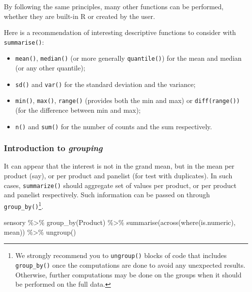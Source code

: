 \documentclass[
]{krantz}
\makeatletter
\newenvironment{Shaded}{\begin{snugshade}}{\end{snugshade}}
\newcommand{\FunctionTok}[1]{\textcolor[rgb]{0,0,0}{#1}}
\newcommand{\NormalTok}[1]{#1}
\newcommand{\SpecialCharTok}[1]{\textcolor[rgb]{0,0,0}{#1}}
\providecommand{\tightlist}{%
  \setlength{\itemsep}{0pt}\setlength{\parskip}{0pt}}
\newenvironment{kframe}{%
\medskip{}
\setlength{\fboxsep}{.8em}
 \def\at@end@of@kframe{}%
 \ifinner\ifhmode%
  \def\at@end@of@kframe{\end{minipage}}%
  \begin{minipage}{\columnwidth}%
 \fi\fi%
 \def\FrameCommand##1{\hskip\@totalleftmargin \hskip-\fboxsep
 \colorbox{shadecolor}{##1}\hskip-\fboxsep
     \hskip-\linewidth \hskip-\@totalleftmargin \hskip\columnwidth}%
 \MakeFramed {\advance\hsize-\width
   \@totalleftmargin\z@ \linewidth\hsize
   \@setminipage}}%
 {\par\unskip\endMakeFramed%
 \at@end@of@kframe}
\renewenvironment{Shaded}{\begin{kframe}}{\end{kframe}}
\makeatother
\begin{document}
By following the same principles, many other functions can be performed, whether they are built-in R or created by the user.

Here is a recommendation of interesting descriptive functions to consider with \texttt{summarise()}:

\begin{itemize}
\tightlist
\item
  \texttt{mean()}, \texttt{median()} (or more generally \texttt{quantile()}) for the mean and median (or any other quantile);
\item
  \texttt{sd()} and \texttt{var()} for the standard deviation and the variance;
\item
  \texttt{min()}, \texttt{max()}, \texttt{range()} (provides both the min and max) or \texttt{diff(range())} (for the difference between min and max);
\item
  \texttt{n()} and \texttt{sum()} for the number of counts and the sum respectively.
\end{itemize}

\hypertarget{introduction-to-grouping}{%
\subsubsection{\texorpdfstring{Introduction to \emph{grouping}}{Introduction to grouping}}\label{introduction-to-grouping}}

It can appear that the interest is not in the grand mean, but in the mean per product (say), or per product and panelist (for test with duplicates). In such cases, \texttt{summarize()} should aggregate set of values per product, or per product and panelist respectively. Such information can be passed on through \texttt{group\_by()}\footnote{We strongly recommend you to \texttt{ungroup()} blocks of code that includes \texttt{group\_by()} once the computations are done to avoid any unexpected results. Otherwise, further computations may be done on the groups when it should be performed on the full data.}.

\begin{Shaded}
\begin{Highlighting}[]
\NormalTok{sensory }\SpecialCharTok{\%\textgreater{}\%}
  \FunctionTok{group\_by}\NormalTok{(Product) }\SpecialCharTok{\%\textgreater{}\%}
  \FunctionTok{summarise}\NormalTok{(}\FunctionTok{across}\NormalTok{(}\FunctionTok{where}\NormalTok{(is.numeric), mean)) }\SpecialCharTok{\%\textgreater{}\%}
  \FunctionTok{ungroup}\NormalTok{()}
\end{Highlighting}
\end{Shaded}
\end{document}
